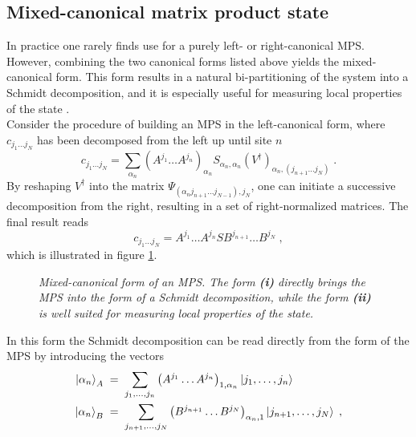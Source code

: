\subsection{Mixed-canonical matrix product state}
In practice one rarely finds use for a purely left- or right-canonical MPS. However, combining the two canonical forms listed above yields the mixed-canonical form. This form results in a natural bi-partitioning of the system into a Schmidt decomposition, and it is especially useful for measuring local properties of the state \cite{schollwock}.\\
Consider the procedure of building an MPS in the left-canonical form, where $c_{j_1 \ldots j_N}$ has been decomposed from the left up until site $n$
\begin{equation}
	c_{j_1 \ldots j_N} = \sum_{\alpha_n} \left( A^{j_1} \ldots  A^{j_n} \right) _{\alpha_n} S_{\alpha_n , \alpha_n} (V^{\dag})_{\alpha_n , (j_{n+1} \ldots j_N)} \; .
\end{equation}
By reshaping $V^{\dag}$  into the matrix $\Psi_{(\alpha_n j_{n+1} \ldots j_{N-1}),j_N}$, one can initiate a successive decomposition from the right, resulting in a set of right-normalized matrices. The final result reads
\begin{equation}
	c_{j_1 \ldots j_N} = A^{j_1} \ldots A^{j_n} S B^{j_{n+1}} \ldots B^{j_N} \; ,
	\label{eq:mixedCanon}
\end{equation}
which is illustrated in figure \ref{fig:MixedCanonical1}.
\begin{figure}[h!]
\centering %
\begin{subfigure}[b]{0.47\textwidth}
	\caption{}  	
  	
	\label{fig:MixedCanonical1}
\end{subfigure}
\hspace{5mm}
\begin{subfigure}[b]{0.47\textwidth}    
	\caption{}  	
  	
	\label{fig:MixedCanonical2}
\end{subfigure}
\caption{\textit{Mixed-canonical form of an MPS. The form \textbf{(i)} directly brings the MPS into the form of a Schmidt decomposition, while the form \textbf{(ii)} is well suited for measuring local properties of the state.}}
\end{figure}
In this form the Schmidt decomposition can be read directly from the form of the MPS by introducing the vectors
\begin{align}
 	\ket{\alpha_n}_A \; &= \; \sum_{j_1 , \ldots , j_n} \left( A^{j_1} \ldots A^{j_n} \right)_{1,\alpha_n} \ket{j_1 , \ldots , j_n}  \label{eq:mixedA} \\
 	\ket{\alpha_n}_B \; &= \; \sum_{j_{n+1} , \ldots , j_N} \left( B^{j_{n+1}} \ldots B^{j_N} \right)_{\alpha_n , 1} \ket{j_{n+1} , \ldots , j_N} \; , \label{eq:mixedB}
\end{align}
